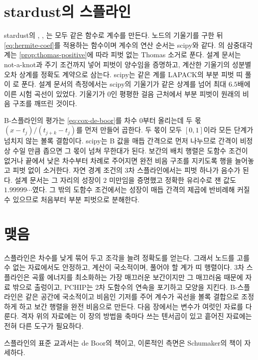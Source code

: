 \section{stardust의 스플라인}
\label{sec:spline-stardust}

\begin{instardust}
stardust의 , , 는 모두 같은 함수로 계수를 만든다. 노드의 기울기를 구한 뒤 \eqref{eq:hermite-coef}를 적용하는 함수이며 계수의 연산 순서는 scipy와 같다. 의 삼중대각 계는 \cref{prop:thomas-positive}에 따라 피벗 없는 Thomas 소거로 푼다. 설계 문서는 not-a-knot과 주기 조건까지 넣어 피벗이 양수임을 증명하고, 계산한 기울기의 성분별 오차 상계를 정확도 계약으로 삼는다. scipy는 같은 계를 LAPACK의 부분 피벗 띠 풀이 로 푼다. 설계 문서의 측정에서는 scipy의 기울기가 같은 상계를 넘어 최대 $6.5$배에 이른 시험 곡선이 있었다. 기울기가 $0$인 평평한 걸음 근처에서 부분 피벗이 원래의 비음 구조를 깨뜨린 것이다.
\end{instardust}

\begin{instardust}
B-스플라인의 평가는 \eqref{eq:cox-de-boor}를 차수 $0$부터 올리는데 두 몫 $(x-t_j)/(t_{j+k}-t_j)$를 먼저 만들어 곱한다. 두 몫이 모두 $[0,1]$이라 모든 단계가 넘치지 않는 볼록 결합이다. scipy는 B 값을 매듭 간격으로 먼저 나누므로 간격이 비정상 수일 만큼 좁으면 그 몫이 넘쳐 무한대가 된다. 보간의 배치 행렬은 도함수 조건이 없거나 끝에서 낮은 차수부터 차례로 주어지면 완전 비음 구조를 지키도록 행을 늘어놓고 피벗 없이 소거한다. 자연 경계 조건의 3차 스플라인에서는 피벗 하나가 음수가 된다. 설계 문서는 그 자리의 성장이 $2$ 미만임을 증명했고 정확한 유리수로 잰 값도 $1.99999\cdots$였다. 그 밖의 도함수 조건에서는 성장이 매듭 간격의 제곱에 반비례해 커질 수 있으므로 처음부터 부분 피벗으로 분해한다.
\end{instardust}

\section{맺음}

스플라인은 차수를 낮게 묶어 두고 조각을 늘려 정확도를 얻는다. 그래서 노드를 고를 수 없는 자료에서도 안정하고, 계산이 국소적이며, 풀어야 할 계가 띠 행렬이다. 3차 스플라인은 곡률 에너지를 최소화하는 가장 매끄러운 보간이지만 그 매끄러움 때문에 자료 밖으로 출렁이고, PCHIP는 2차 도함수의 연속을 포기하고 모양을 지킨다. B-스플라인은 같은 공간에 국소적이고 비음인 기저를 주어 계수가 곡선을 볼록 결합으로 조정하게 하고 보간 행렬을 완전 비음으로 만든다. 다음 장에서는 변수가 여럿인 자료를 다룬다. 격자 위의 자료에는 이 장의 방법을 축마다 쓰는 텐서곱이 있고 흩어진 자료에는 전혀 다른 도구가 필요하다.

스플라인의 표준 교과서는 de Boor의 책\cite{deboor2001guide}이고, 이론적인 측면은 Schumaker의 책\cite{schumaker2007}이 자세하다.

\chapterreferences
